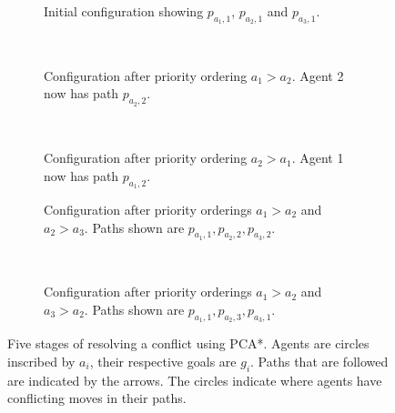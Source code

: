 \begin{figure}
    \centering
    \begin{subfigure}[t]{.3\textwidth}
        \centering
        \def\svgscale{.6}
        
        \caption{Initial configuration showing $p_{a_1,1}$, $p_{a_2,1}$ and 
            $p_{a_3,1}$.}
        \label{fig:pca-initial}
    \end{subfigure}
    ~
    \begin{subfigure}[t]{.3\textwidth}
        \centering
        \def\svgscale{.6}
        
        \caption{Configuration after priority ordering $a_1 > a_2$. Agent 2 now 
            has path $p_{a_2,2}$.}
        \label{fig:pca-2}
    \end{subfigure}
    ~
    \begin{subfigure}[t]{.3\textwidth}
        \centering
        \def\svgscale{.6}
        
        \caption{Configuration after priority ordering $a_2 > a_1$. Agent 1 now 
            has path $p_{a_1,2}$.}
        \label{fig:pca-3}
    \end{subfigure}
    
    \begin{subfigure}[t]{.4\textwidth}
        \centering
        \def\svgscale{.6}
        
        \caption{Configuration after priority orderings $a_1 > a_2$ and $a_2 > 
            a_3$. Paths shown are $p_{a_1,1}, p_{a_2,2}, p_{a_3,2}$.}
        \label{fig:pca-4}
    \end{subfigure}
    ~
    \begin{subfigure}[t]{.4\textwidth}
        \centering
        \def\svgscale{.6}
        
        \caption{Configuration after priority orderings $a_1 > a_2$ and $a_3 > 
            a_2$. Paths shown are $p_{a_1,1}, p_{a_2,3}, p_{a_3,1}$.}
        \label{fig:pca-5}
    \end{subfigure}
    
    \caption{Five stages of resolving a conflict using PCA*. Agents are circles
        inscribed by $a_i$, their respective goals are $g_i$. Paths that are 
        followed are indicated by the arrows. The circles indicate where agents 
        have conflicting moves in their paths.}
    \label{fig:pca-example}
\end{figure}

